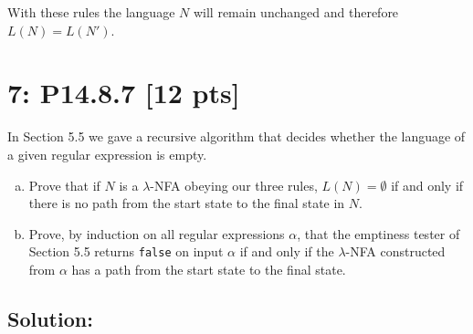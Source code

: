 \documentclass[12pt]{article}
\begin{document}
With these rules the language $N$ will remain unchanged and therefore $L(N) = L(N')$.


\newpage
\section*{\textbf{7: P14.8.7} [12 pts]}
In Section 5.5 we gave a recursive algorithm that decides whether the language of a given regular expression is empty.
\begin{enumerate}[(a)]
    \item  Prove that if $N$ is a $\lambda$-NFA obeying our three rules, $L(N) = \emptyset$ if and only if there is no path from the start state to the final state in $N$.

    \item Prove, by induction on all regular expressions $\alpha$, that the emptiness tester of Section 5.5 returns \texttt{false} on input $\alpha$ if and only if the $\lambda$-NFA constructed from $\alpha$ has a path from the start state to the final state.
\end{enumerate}


\subsection*{\textbf{Solution:}}
\end{document}
